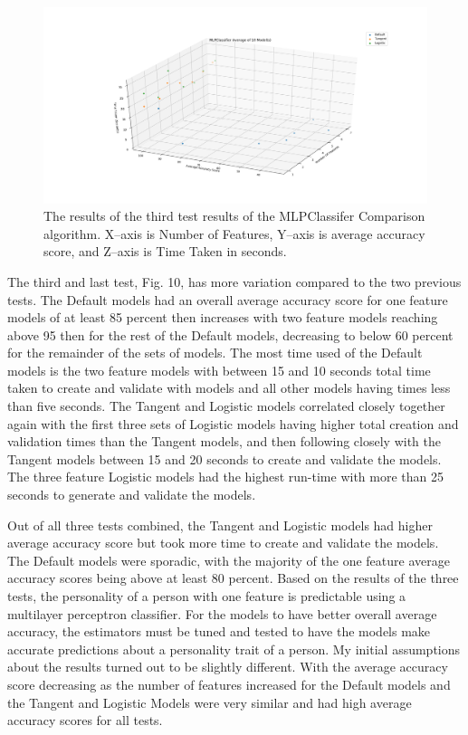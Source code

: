 \documentclass[a4paper, 12pt]{article}
\begin{document}
\begin{paragraph}
\begin{figure}[h]
\centering
\includegraphics[scale=0.37]{Test_3}
\caption{The results of the third test results of the MLPClassifer Comparison algorithm. X--axis is Number of Features, Y--axis is average accuracy score, and Z--axis is Time Taken in seconds.}
\end{figure}

The third and last test, Fig. 10, has more variation compared to the two previous tests. The Default models had an overall average accuracy score for one feature models of at least 85 percent then increases with two feature models reaching above 95 then for the rest of the Default models, decreasing to below 60 percent for the remainder of the sets of models. The most time used of the Default models is the two feature models with between 15 and 10 seconds total time taken to create and validate with models and all other models having times less than five seconds. The Tangent and Logistic models correlated closely together again with the first three sets of Logistic models having higher total creation and validation times than the Tangent models, and then following closely with the Tangent models between 15 and 20 seconds to create and validate the models. The three feature Logistic models had the highest run-time with more than 25 seconds to generate and validate the models.

\par
Out of all three tests combined, the Tangent and Logistic models had higher average accuracy score but took more time to create and validate the models. The Default models were sporadic, with the majority of the one feature average accuracy scores being above at least 80 percent. Based on the results of the three tests, the personality of a person with one feature is predictable using a multilayer perceptron classifier. For the models to have better overall average accuracy, the estimators must be tuned and tested to have the models make accurate predictions about a personality trait of a person. My initial assumptions about the results turned out to be slightly different. With the average accuracy score decreasing as the number of features increased for the Default models and the Tangent and Logistic Models were very similar and had high average accuracy scores for all tests.
\end{paragraph}
\end{document}
